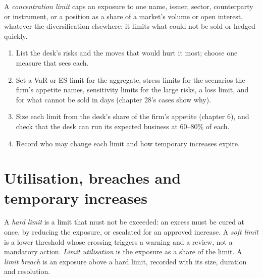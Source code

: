 \begin{definition}\label{def:fm:limits-and-capital-allocation:conc}
A \emph{concentration limit} caps an exposure to one name, issuer, sector, counterparty or instrument, or a position
as a share of a market's volume or open interest, whatever the diversification elsewhere: it limits what could not be sold or hedged quickly.
\end{definition}

\begin{method}\label{met:fm:limits-and-capital-allocation:choose}
\begin{enumerate}
\item List the desk's risks and the moves that would hurt it most; choose one measure that sees each.
\item Set a VaR or ES limit for the aggregate, stress limits for the scenarios the firm's appetite names, sensitivity limits for the large
risks, a loss limit, and  for what cannot be sold in days (chapter 28's cases show why).
\item Size each limit from the desk's share of the firm's appetite (chapter 6), and check that the desk can run its expected business at 60--80\%
of each.
\item Record who may change each limit and how temporary increases expire.
\end{enumerate}
\end{method}

\section{Utilisation, breaches and temporary increases}

\begin{definition}\label{def:fm:limits-and-capital-allocation:breach}
A \emph{hard limit} is a limit that must not be exceeded: an excess must be cured at once, by reducing the exposure, or
escalated for an approved increase. A \emph{soft limit} is a lower threshold whose crossing triggers a warning and a review, not
a mandatory action. \emph{Limit utilisation} is the exposure as a share of the limit. A \emph{limit breach} is an exposure above a hard limit, recorded with its size, duration and resolution.
\end{definition}

